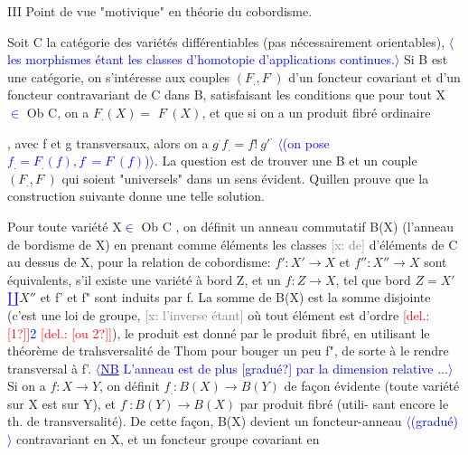 \documentclass[11pt]{article}
\newcommand{\scanpage}[1]{\par\bigskip\noindent{\small\sffamily[scan #1]}\par}
\newcommand{\hand}[1]{\textcolor{blue}{#1}}
\newcommand{\inserted}[2][]{\textcolor{blue}{$\langle$#2$\rangle$}}
\newcommand{\deleted}[1]{\textcolor{red}{[\textsf{del.:} #1]}}
\newcommand{\xout}[1]{\textcolor{gray}{[\textsf{x:} #1]}}
\newcommand{\uline}[1]{\underline{#1}}
\newcommand{\unsure}[1]{[#1?]}
\newenvironment{diagramblock}{\par\begin{center}}{\end{center}\par}
\begin{document}
\clearpage
\scanpage{162-5/43}
III   Point de vue "motivique" en théorie du cobordisme.

Soit C la catégorie des variétés différentiables (pas nécessairement
orientables), \inserted[typed]{les morphismes étant les classes d'homotopie d'applications continues.} Si B est une catégorie, on s'intéresse aux couples
$(F_{.},F^{\cdot})$ d'un foncteur covariant et d'un foncteur contravariant de C
dans B, satisfaisant les conditions que pour tout X \hand{$\in$} Ob C, on a $F_{.}(X)=$
$F^{\cdot}(X)$, et que si on a un produit fibré ordinaire
\begin{diagramblock}
\end{diagramblock}
,
avec f et g transversaux, alors on a $g^{\cdot}f_{.} = f!\ g'^{\cdot}$ \inserted[typed]{(on pose $f_{.}=F_{.}(f),f^{\cdot}=F^{\cdot}(f)$)}. La question est
de trouver une B et un couple $(F_{.},F^{\cdot})$ qui soient "universels" dans un
sens évident. Quillen prouve que la construction suivante donne une
telle solution.

Pour toute variété X\hand{$\in$} Ob C , on définit un anneau commutatif
B(X) (l'anneau de bordisme de X) en prenant comme éléments les classes
\xout{de} d'éléments de C au dessus de X, pour la relation de cobordisme:
$f':X'\to X$ et $f'':X''\to X$ sont équivalents, s'il existe une variété à bord
Z, et un $f:Z\to X$, tel que bord $Z = X'$\hand{$\amalg$}$X''$ et f' et f" sont induits
par f. La somme de B(X) est la somme disjointe (c'est une loi de groupe,
\xout{l'inverse étant} où tout élément est d'ordre \deleted{\unsure{1}}\hand{2} \deleted{\unsure{ou 2}}), le produit est
donné par le produit fibré, en utilisant le théorème de trahsversalité
de Thom pour bouger un peu f", de sorte à le rendre transversal à f'.
\inserted{\uline{NB} L'anneau est de plus \unsure{gradué} par la dimension relative ...}
Si on a $f: X\to Y$, on définit $f_{.} : B(X)\to B(Y)$ de façon évidente (toute
variété sur X est sur Y), et $f^{\cdot}: B(Y)\to B(X)$ par produit fibré (utili-%
sant encore le th. de transversalité). De cette façon, B(X) devient un
foncteur-anneau \inserted{(gradué)} contravariant en X, et un foncteur groupe covariant en
\end{document}
